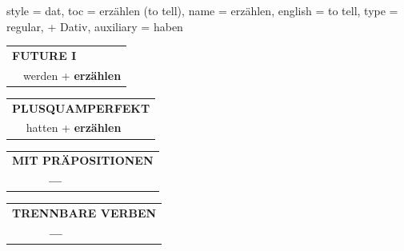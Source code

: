 \begin{verbentry}{
  style = {dat},
  toc = {erzählen (to tell)},
  name = {erzählen},
  english = {to tell},
  type = {regular, + Dativ},
  auxiliary = {haben}
}
\begin{tabular}{rl}
    \multicolumn{2}{l}{\textbf{FUTURE I} }\\
  &  werden + \textbf{erzählen}\\
 
  \end{tabular}
\hfill
   \begin{tabular}{rl}
      \multicolumn{2}{l}{\textbf{PLUSQUAMPERFEKT}}\\
   & hatten + \textbf{erzählen}\\
  \end{tabular}
  
  
\vspace{10pt}

\begin{tabular}{lll}
\multicolumn{3}{l}{\textbf{MIT PRÄPOSITIONEN}}\\
& \textbf{---} & \\
\end{tabular}
\hfill
\begin{tabular}{lll}
\multicolumn{3}{l}{\textbf{TRENNBARE VERBEN}}\\
& \textbf{---} & \\
\end{tabular}
\vspace{-5pt}
\end{verbentry}

